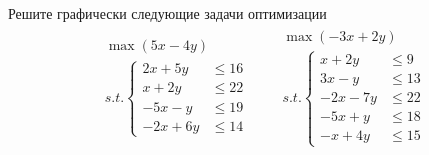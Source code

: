 \begin{exercise}
Решите графически следующие задачи оптимизации
\begin{align*}
	& \begin{gathered}
		\max(5x-4y) \\
		s.t.\left\{\begin{aligned}
			2x+5y &\leqslant 16 \\ x+2y &\leqslant 22 \\ 
			-5x-y &\leqslant 19 \\ -2x+6y &\leqslant 14
		\end{aligned}\right.
	\end{gathered} &
	& \begin{gathered}
		\max(-3x+2y) \\
		s.t.\left\{\begin{aligned}
			x+2y &\leqslant 9 \\ 3x-y &\leqslant 13 \\ 
			-2x-7y &\leqslant 22 \\ -5x+y &\leqslant 18 \\ 
			-x+4y &\leqslant 15
		\end{aligned}\right.
	\end{gathered} 
\end{align*}
\end{exercise}



